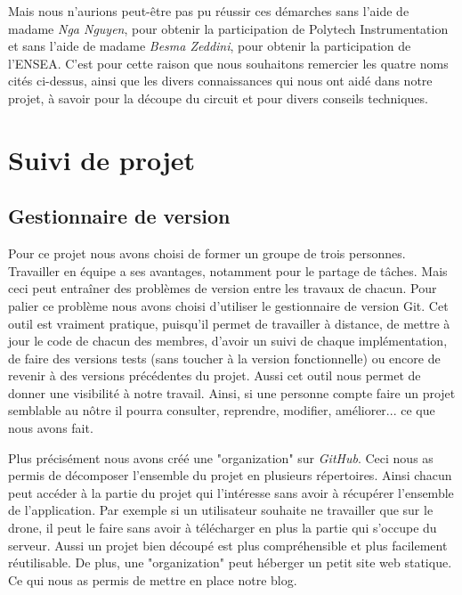 \documentclass[a4paper,10pt]{report}
\begin{document}
    Mais nous n'aurions peut-être pas pu réussir ces démarches sans l'aide de 
madame \textit{Nga Nguyen}, pour obtenir la participation de Polytech 
Instrumentation et sans l'aide de madame \textit{Besma Zeddini}, pour obtenir 
la participation de l'ENSEA. C'est pour cette raison que nous souhaitons 
remercier les quatre noms cités ci-dessus, ainsi que les divers connaissances 
qui nous ont aidé dans notre projet, à savoir pour la découpe du circuit et 
pour 
divers conseils techniques.
   
  \appendix
    \chapter{Suivi de projet}
      \section{Gestionnaire de version}
	Pour ce projet nous avons choisi de former un groupe de trois 
personnes. Travailler en équipe a ses avantages, notamment pour le partage de 
tâches. Mais ceci peut entraîner des problèmes de version entre les travaux de 
chacun. Pour palier ce problème nous avons choisi d'utiliser le gestionnaire 
de version Git\cite{git}. Cet outil est vraiment pratique, puisqu'il permet de 
travailler à distance, de mettre à jour le code de chacun des membres, d'avoir 
un suivi de chaque implémentation, de faire des versions tests (sans toucher à 
la version fonctionnelle) ou encore de revenir à des versions précédentes du 
projet. Aussi cet outil nous permet de donner une visibilité à notre travail. 
Ainsi, si une personne compte faire un projet semblable au nôtre il pourra 
consulter, reprendre, modifier, améliorer... ce que nous avons fait.

	Plus précisément nous avons créé une "organization"\cite{njordgit} sur 
\textit{GitHub}\cite{github}. Ceci nous as permis de décomposer l'ensemble du 
projet en plusieurs répertoires. Ainsi chacun peut accéder à la partie du 
projet qui l'intéresse sans avoir à récupérer l'ensemble de l'application. Par 
exemple si un utilisateur souhaite ne travailler que sur le drone, il peut le 
faire sans avoir à télécharger en plus la partie qui s'occupe du serveur. Aussi 
un projet bien découpé est plus compréhensible et plus facilement réutilisable. 
De plus, une "organization" peut héberger un petit site web statique. Ce qui 
nous as permis de mettre en place notre blog\cite{njordblog}. 
	
\end{document}
